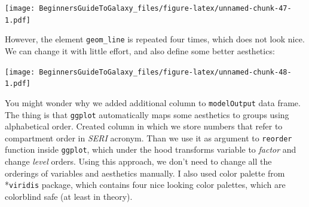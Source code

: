 \documentclass[]{book}
\newenvironment{Shaded}{\begin{snugshade}}{\end{snugshade}}
\newcommand{\KeywordTok}[1]{\textcolor[rgb]{0.13,0.29,0.53}{\textbf{#1}}}
\newcommand{\DataTypeTok}[1]{\textcolor[rgb]{0.13,0.29,0.53}{#1}}
\newcommand{\DecValTok}[1]{\textcolor[rgb]{0.00,0.00,0.81}{#1}}
\newcommand{\StringTok}[1]{\textcolor[rgb]{0.31,0.60,0.02}{#1}}
\newcommand{\OperatorTok}[1]{\textcolor[rgb]{0.81,0.36,0.00}{\textbf{#1}}}
\newcommand{\NormalTok}[1]{#1}
\theoremstyle{definition}
\theoremstyle{definition}
\theoremstyle{definition}
\theoremstyle{remark}
\begin{document}
\texttt{[image: BeginnersGuideToGalaxy\_files/figure-latex/unnamed-chunk-47-1.pdf]}

However, the element \texttt{geom\_line} is repeated four times, which
does not look nice. We can change it with little effort, and also define
some better aesthetics:

\begin{Shaded}
\end{Shaded}

\texttt{[image: BeginnersGuideToGalaxy\_files/figure-latex/unnamed-chunk-48-1.pdf]}

You might wonder why we added additional column to \texttt{modelOutput}
data frame. The thing is that \texttt{ggplot} automatically maps some
aesthetics to groups using alphabetical order. Created column in which
we store numbers that refer to compartment order in \emph{SERI} acronym.
Than we use it as argument to \texttt{reorder} function inside
\texttt{ggplot}, which under the hood transforms variable to
\emph{factor} and change \emph{level} orders. Using this approach, we
don't need to change all the orderings of variables and aesthetics
manually. I also used color palette from *\texttt{viridis} package,
which contains four nice looking color palettes, which are colorblind
safe (at least in theory).
\end{document}
